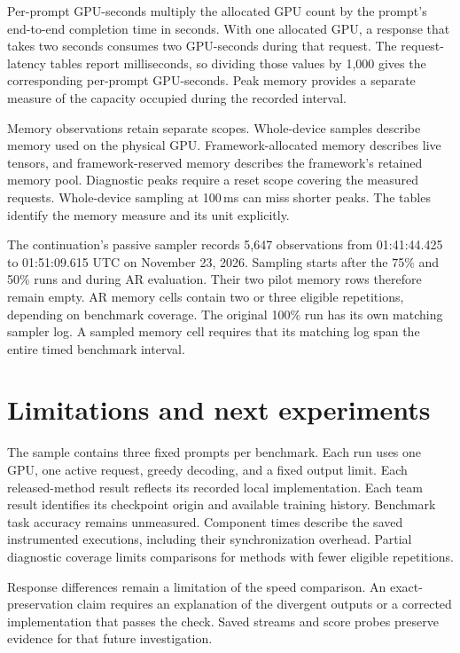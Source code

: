 \documentclass[conference,onecolumn]{IEEEtran}
\begin{document}
Per-prompt GPU-seconds multiply the allocated GPU count by the prompt's end-to-end completion time in seconds. With one allocated GPU, a response that takes two seconds consumes two GPU-seconds during that request. The request-latency tables report milliseconds, so dividing those values by 1,000 gives the corresponding per-prompt GPU-seconds. Peak memory provides a separate measure of the capacity occupied during the recorded interval.

Memory observations retain separate scopes. Whole-device samples describe memory used on the physical GPU. Framework-allocated memory describes live tensors, and framework-reserved memory describes the framework's retained memory pool. Diagnostic peaks require a reset scope covering the measured requests. Whole-device sampling at 100\,ms can miss shorter peaks. The tables identify the memory measure and its unit explicitly.

The continuation's passive sampler records 5,647 observations from 01:41:44.425 to 01:51:09.615 UTC on November 23, 2026. Sampling starts after the 75\% and 50\% runs and during AR evaluation. Their two pilot memory rows therefore remain empty. AR memory cells contain two or three eligible repetitions, depending on benchmark coverage. The original 100\% run has its own matching sampler log. A sampled memory cell requires that its matching log span the entire timed benchmark interval.

\section{Limitations and next experiments}
The sample contains three fixed prompts per benchmark. Each run uses one GPU, one active request, greedy decoding, and a fixed output limit. Each released-method result reflects its recorded local implementation. Each team result identifies its checkpoint origin and available training history. Benchmark task accuracy remains unmeasured. Component times describe the saved instrumented executions, including their synchronization overhead. Partial diagnostic coverage limits comparisons for methods with fewer eligible repetitions.

Response differences remain a limitation of the speed comparison. An exact-preservation claim requires an explanation of the divergent outputs or a corrected implementation that passes the check. Saved streams and score probes preserve evidence for that future investigation.
\end{document}
